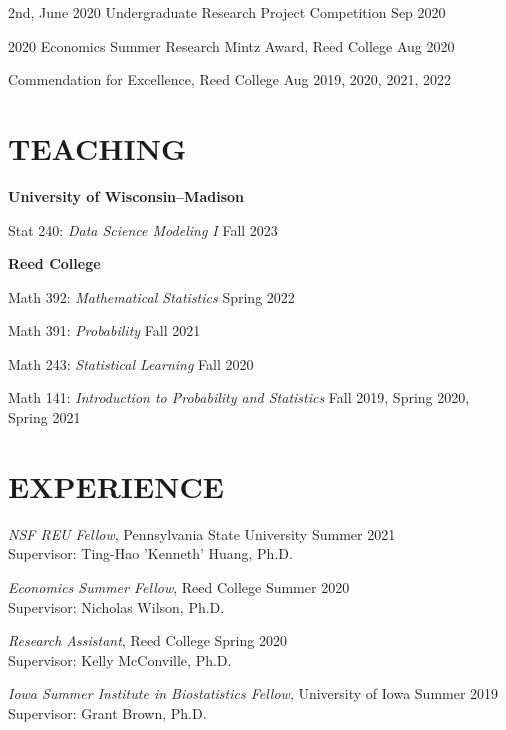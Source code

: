 \documentclass[margin]{res}
\begin{document}
\begin{resume}
2nd, June 2020 Undergraduate Research Project Competition \hfill Sep 2020

2020 Economics Summer Research Mintz Award, Reed College \hfill Aug 2020

Commendation for Excellence, Reed College \hfill Aug 2019, 2020, 2021, 2022

\section{TEACHING}

\textbf{University of Wisconsin--Madison}

Stat 240: {\it Data Science Modeling I} \hfill Fall 2023

\textbf{Reed College} 

Math 392: {\it Mathematical Statistics} \hfill Spring 2022

Math 391: {\it Probability} \hfill Fall 2021

Math 243: {\it Statistical Learning} \hfill Fall 2020

Math 141: {\it Introduction to Probability and Statistics} \hfill Fall 2019, Spring 2020, Spring 2021


\section{EXPERIENCE}

\emph{NSF REU Fellow}, Pennsylvania State University \hfill Summer 2021 \\
Supervisor: Ting-Hao 'Kenneth' Huang, Ph.D.

\emph{Economics Summer Fellow}, Reed College \hfill Summer 2020 \\
Supervisor: Nicholas Wilson, Ph.D.

\emph{Research Assistant}, Reed College \hfill Spring 2020 \\
Supervisor: Kelly McConville, Ph.D.

\emph{Iowa Summer Institute in Biostatistics Fellow}, University of Iowa \hfill Summer 2019 \\
Supervisor: Grant Brown, Ph.D.


\end{resume} 
\end{document}
